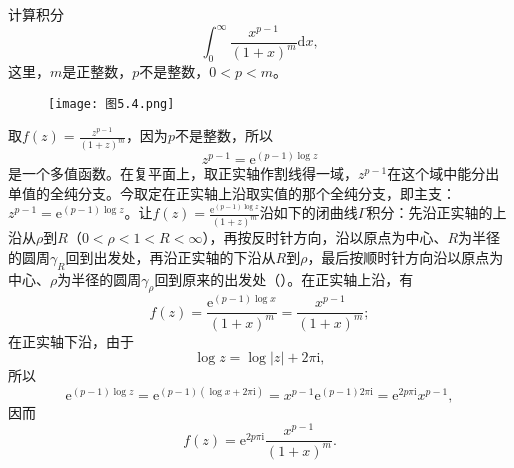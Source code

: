 \documentclass[../../main.tex]{subfiles}
\begin{document}
\begin{example}\label{example:例5.5.11}
计算积分
\[
\int_{0}^{\infty} \frac{x^{p - 1}}{(1 + x)^m} \mathrm{d}x,
\]
这里，\( m \)是正整数，\( p \)不是整数，\( 0 < p < m \)。
\end{example}
\begin{figure}[H]
\centering
\texttt{[image: 图5.4.png]}
\caption{}
\label{figure:图5.4}
\end{figure}
\begin{solution}
取\( f(z) = \frac{z^{p - 1}}{(1 + z)^m} \)，因为\( p \)不是整数，所以
\[
z^{p - 1} = \mathrm{e}^{(p - 1)\log z}
\]
是一个多值函数。在复平面上，取正实轴作割线得一域，\( z^{p - 1} \)在这个域中能分出单值的全纯分支。今取定在正实轴上沿取实值的那个全纯分支，即主支：\( z^{p - 1} = \mathrm{e}^{(p - 1)\log z} \)。让\( f(z) = \frac{\mathrm{e}^{(p - 1)\log z}}{(1 + z)^m} \)沿如下的闭曲线\( \Gamma \)积分：先沿正实轴的上沿从\( \rho \)到\( R \)（\( 0 < \rho < 1 < R < \infty \)），再按反时针方向，沿以原点为中心、\( R \)为半径的圆周\( \gamma_R \)回到出发处，再沿正实轴的下沿从\( R \)到\( \rho \)，最后按顺时针方向沿以原点为中心、\( \rho \)为半径的圆周\( \gamma_{\rho} \)回到原来的出发处（）。在正实轴上沿，有
\[
f(z) = \frac{\mathrm{e}^{(p - 1)\log x}}{(1 + x)^m} = \frac{x^{p - 1}}{(1 + x)^m};
\]
在正实轴下沿，由于
\[
\log z = \log|z| + 2\pi \mathrm{i},
\]
所以
\[
\mathrm{e}^{(p - 1)\log z} = \mathrm{e}^{(p - 1)(\log x + 2\pi \mathrm{i})}
= x^{p - 1} \mathrm{e}^{(p - 1)2\pi \mathrm{i}}
= \mathrm{e}^{2p\pi \mathrm{i}} x^{p - 1},
\]
因而
\[
f(z) = \mathrm{e}^{2p\pi \mathrm{i}} \frac{x^{p - 1}}{(1 + x)^m}.
\]


\end{solution}
\end{document}
